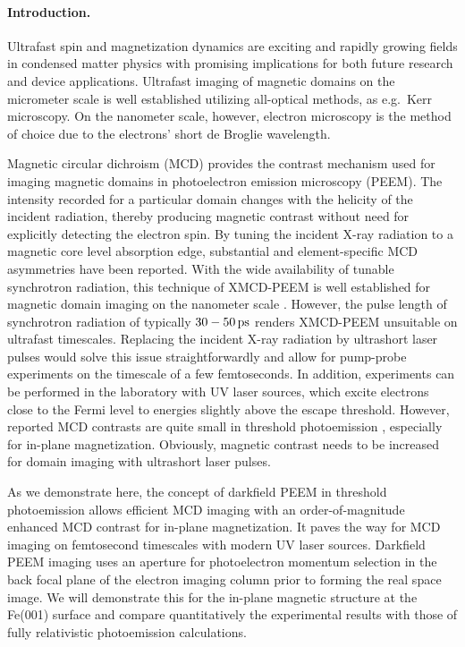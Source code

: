 \documentclass[prl,twocolumn,floatfix,superscriptaddress,aps]{revtex4-2}
\begin{document}
\maketitle
\paragraph{Introduction.} Ultrafast spin and magnetization dynamics are exciting and rapidly growing fields in condensed matter physics with promising implications for both future research and device applications. Ultrafast imaging of magnetic domains on the micrometer scale is well established utilizing all-optical methods, as e.g.\ Kerr microscopy. On the nanometer scale, however, electron microscopy is the method of choice due to the electrons' short de Broglie wavelength. 

Magnetic circular dichroism (MCD) provides the contrast mechanism used for imaging magnetic domains in photoelectron emission microscopy (PEEM). The intensity recorded for a particular domain changes with the helicity of the incident radiation, thereby producing magnetic contrast without need for explicitly detecting the electron spin. By tuning the incident X-ray radiation to a magnetic core level absorption edge, substantial and element-specific MCD asymmetries have been reported. With the wide availability of tunable synchrotron radiation, this technique of XMCD-PEEM is well established for magnetic domain imaging on the nanometer scale \cite{kuch15}. However, the pulse length of synchrotron radiation of typically $\unit[30-50]{ps}$ renders XMCD-PEEM unsuitable on ultrafast timescales. Replacing the incident X-ray radiation by ultrashort laser pulses would solve this issue straightforwardly and allow for pump-probe experiments on the timescale of a  few femtoseconds. In addition, experiments can be performed in the laboratory with UV laser sources, which excite electrons close to the Fermi level to energies slightly above the escape threshold. However, reported MCD contrasts are quite small in threshold photoemission \cite{marx2000}, especially for in-plane magnetization. Obviously, magnetic contrast needs to be increased for domain imaging with ultrashort laser pulses.

As we demonstrate here, the concept of darkfield PEEM in threshold photoemission allows efficient MCD imaging with an order-of-magnitude enhanced MCD contrast for in-plane magnetization. It paves the way for MCD imaging on femtosecond timescales with modern UV laser sources. Darkfield PEEM imaging uses an aperture for photoelectron momentum selection in the back focal plane of the electron imaging column prior to forming the real space image. We will demonstrate this for the in-plane magnetic structure at the Fe(001) surface and compare quantitatively the experimental results with those of fully relativistic photoemission calculations.
\end{document}
